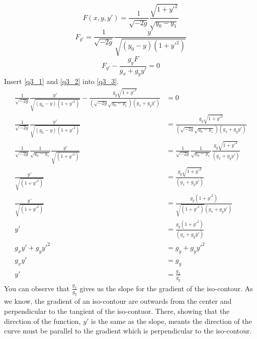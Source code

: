 \begin{equation}\label{q3_1}
F(x,y,y') = \frac{1}{\sqrt{-2g}}\frac{\sqrt{1+y'^2}}{\sqrt{y_0 - y_1}}
\end{equation}
\begin{equation}\label{q3_2}
F_{y'} = \frac{1}{\sqrt{-2g}}\frac{y'}{\sqrt{(y_0 - y)(1 + y'^2)}}
\end{equation}
\begin{equation}\label{q3_3}
F_{y'} - \frac{g_y F}{g_x + g_y y'} = 0
\end{equation}
Insert \ref{q3_1} and \ref{q3_2} into \ref{q3_3}.
\begin{equation}
\begin{aligned}
\frac{1}{\sqrt{-2g}}\frac{y'}{\sqrt{(y_0 - y)(1 + y'^2)}} - \frac{g_y \sqrt{1+y'^2}}{(\sqrt{-2g}\sqrt{y_0 - y_1})(g_x + g_y y')} &= 0\\
\frac{1}{\sqrt{-2g}}\frac{y'}{\sqrt{(y_0 - y)(1 + y'^2)}} &= \frac{g_y \sqrt{1+y'^2}}{(\sqrt{-2g}\sqrt{y_0 - y_1})(g_x + g_y y')}\\
\frac{1}{\sqrt{-2g}} \frac{1}{\sqrt{y_0 - y_1}} \frac{y'}{\sqrt{(1 + y'^2)}} &= \frac{1}{\sqrt{-2g}} \frac{1}{\sqrt{y_0 - y_1}} \frac{g_y \sqrt{1+y'^2}}{(g_x + g_y y')}\\
\frac{y'}{\sqrt{(1 + y'^2)}} &= \frac{g_y \sqrt{1+y'^2}}{(g_x + g_y y')}\\
\frac{y'}{\sqrt{(1 + y'^2)}} &= \frac{g_y(1+y'^2)}{\sqrt{(1 + y'^2)}(g_x + g_y y')}\\
y' &= \frac{g_y(1+y'^2)}{(g_x + g_y y')}\\
g_xy' + g_yy'^2 &= g_y + g_yy'^2\\
g_xy' &= g_y\\
y' &= \frac{g_x}{g_y}
\end{aligned}
\end{equation}
You can observe that $\frac{g_x}{g_y}$ gives us the slope for the gradient of the iso-contour. As we know, the gradient of an iso-contour are outwards from the center and perpendicular to the tangient of the iso-contuor. There, showing that the direction of the function, $y'$ is the same as the slope, meants the direction of the curve must be parallel to the gradient which is perpendicular to the iso-contour.
